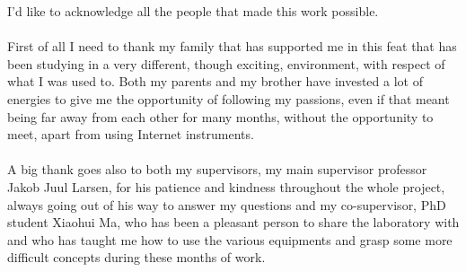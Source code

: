 \documentclass[
11pt, %
english, %
singlespacing, %
headsepline, %
]{MastersDoctoralThesis} %
\begin{document}
\begin{acknowledgements}
\addchaptertocentry{\acknowledgementname} %
I'd like to acknowledge all the people that made this work possible.
\\
\\
First of all I need to thank my family that has supported me in this feat that has been studying in a very different, though exciting, environment, with respect of what I was used to. Both my parents and my brother have invested a lot of energies to give me the opportunity of following my passions, even if that meant being far away from each other for many months, without the opportunity to meet, apart from using Internet instruments.
\\
\\
A big thank goes also to both my supervisors, my main supervisor professor Jakob Juul Larsen, for his patience and kindness throughout the whole project, always going out of his way to answer my questions and my co-supervisor, PhD student Xiaohui Ma, who has been a pleasant person to share the laboratory with and who has taught me how to use the various equipments and grasp some more difficult concepts during these months of work.
\end{acknowledgements}
\end{document}
